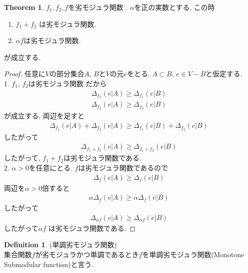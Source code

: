 \documentclass[11pt, a4paper, dvipdfmx]{jsarticle}
\theoremstyle{definition}
\newtheorem{Definition+}[Axiom+]{Definition}
\newtheorem{Theorem+}[Axiom+]{Theorem}
\begin{document}
\begin{Theorem+}
    $f_{1}, f_{2}, f$を劣モジュラ関数 . $\alpha$を正の実数とする. この時
    \begin{enumerate}
        \item $f_{1} + f_{2} $ は劣モジュラ関数.
        \item $\alpha f$は劣モジュラ関数.
    \end{enumerate}
    が成立する.
    \begin{proof}
        任意に$V$の部分集合$A$, $B$と$V$の元$e$をとる. $A\subset B$, $e\in V - B$と仮定する.\\
        1. $f_{1}$, $f_{2}$は劣モジュラ関数 だから
        \begin{align*}
            \Delta_{f_{1}}(e|A)\geq \Delta_{f_{1}}(e|B)
        \end{align*}
        \begin{align*}
            \Delta_{f_{2}}(e|A)\geq \Delta_{f_{2}}(e|B)
        \end{align*}
        が成立する. 両辺を足すと
        \begin{align*}
            \Delta_{f_{1}}(e|A) + \Delta_{f_{2}}(e|A)\geq \Delta_{f_{1}}(e|B) + \Delta_{f_{2}}(e|B)
        \end{align*}
        したがって
        \begin{align*}
            \Delta_{f_{1} + f_{2}}(e|A)\geq \Delta_{f_{1} + f_{2}}(e|B)
        \end{align*}
        したがって, $f_{1} + f_{2}$は劣モジュラ関数である.\\
        2. $\alpha > 0$を任意にとる. $f$は劣モジュラ関数であるので
        \begin{align*}
            \Delta_{f}(e|A)\geq \Delta_{f}(e|B)
        \end{align*}
        両辺を$\alpha > 0$倍すると
        \begin{align*}
            \alpha\Delta_{f}(e|A)\geq \alpha\Delta_{f}(e|B)
        \end{align*}
        したがって
        \begin{align*}
            \Delta_{\alpha f}(e|A)\geq \Delta_{\alpha f}(e|B)
        \end{align*}
        したがって$\alpha f$ は劣モジュラ関数である.
     \end{proof}
\end{Theorem+}
\begin{Definition+}(単調劣モジュラ関数)\\
    集合関数$f$が劣モジュラかつ単調であるとき$f$を単調劣モジュラ関数(Monotone Submodular function)と言う.
\end{Definition+}
\end{document}
